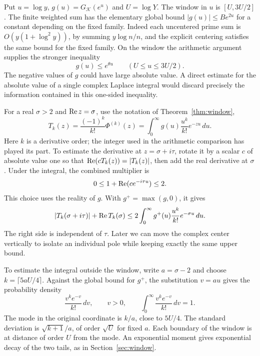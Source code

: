 Put \(u=\log y\), \(g(u)=G_{\mathcal K}(e^u)\) and \(U=\log Y\).
The window in \(u\) is \([U,3U/2]\). The finite weighted sum has
the elementary global bound \(|g(u)|\le Be^{2u}\) for a constant
depending on the fixed family. Indeed each uncentered prime sum is
\(O(y(1+\log^2 y))\), by summing \(y\log n/n\), and the explicit
centering satisfies the same bound for the fixed family. On the
window the arithmetic argument supplies the stronger inequality
\[
              g(u)\le e^{\theta u}
                     \qquad(U\le u\le 3U/2).
\]
The negative values of \(g\) could have large absolute value. A
direct estimate for the absolute value of a single complex Laplace
integral would discard precisely the information contained in this
one-sided inequality.

For a real \(\sigma>2\) and \(\operatorname{Re} z=\sigma\), use the notation
of Theorem~\ref{thm:window},
\[
 T_k(z)=\frac{(-1)^k}{k!}\Phi^{(k)}(z)
       =\int_0^\infty g(u)\frac{u^k}{k!}e^{-zu}\,du .
\]
Here \(k\) is a derivative order; the integer used in the arithmetic
comparison has played its part. To estimate the derivative at
\(z=\sigma+i\tau\), rotate it by a scalar \(c\) of absolute value one
so that \(\operatorname{Re}(cT_k(z))=|T_k(z)|\), then add the real derivative
at \(\sigma\). Under the integral, the combined multiplier is
\[
         0\le 1+\operatorname{Re}(ce^{-i\tau u})\le2 .
\]
This choice uses the reality of \(g\). With \(g^+=\max(g,0)\), it gives
\[
 |T_k(\sigma+i\tau)|+\operatorname{Re} T_k(\sigma)
       \le 2\int_0^\infty g^+(u)\frac{u^k}{k!}e^{-\sigma u}\,du .
\]
The right side is independent of \(\tau\). Later we can move the
complex center vertically to isolate an individual pole while
keeping exactly the same upper bound.

To estimate the integral outside the window, write \(a=\sigma-2\)
and choose \(k=\lceil 5aU/4\rceil\). Against the global bound for
\(g^+\), the substitution \(v=au\) gives the probability density
\[
             \frac{v^k e^{-v}}{k!}\,dv,\qquad
             v>0,\qquad \int_0^\infty\frac{v^k e^{-v}}{k!}\,dv=1 .
\]
The mode in the original coordinate is \(k/a\), close to \(5U/4\).
The standard deviation is \(\sqrt{k+1}/a\), of order \(\sqrt U\)
for fixed \(a\). Each boundary of the window is at distance of order
\(U\) from the mode. An exponential moment gives exponential decay
of the two tails, as in Section~\ref{sec:window}.

